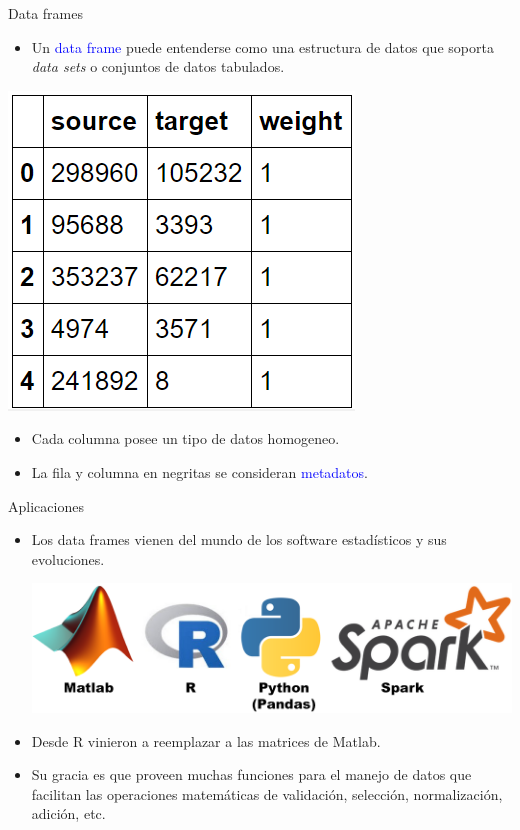 \documentclass[handout]{beamer} %
\newcommand{\blue}[1]{\textcolor{blue}{#1}}
\begin{document}
\begin{frame}{Data frames}
  \begin{itemize}
    \item Un \blue{data frame} puede entenderse como una estructura de datos que soporta {\em data sets} o conjuntos de datos tabulados.
  \end{itemize}
  \begin{center}
      \includegraphics[width=.4\textwidth]{./image/cap9/dataframe.png}
  \end{center}
  \begin{itemize}
      \item<2-> Cada columna posee un tipo de datos homogeneo.
      \item<3-> La fila y columna en negritas se consideran \blue{metadatos}.
  \end{itemize}
\end{frame}

\begin{frame}{Aplicaciones}
  \begin{itemize}
    \item<1-> Los data frames vienen del mundo de los software estadísticos y sus evoluciones.
    \begin{center}
      \includegraphics[width=.8\textwidth]{./image/cap9/tecnologias.png}
    \end{center}
    \item<2-> Desde R vinieron a reemplazar a las matrices de Matlab.
    \item<3-> Su gracia es que proveen muchas funciones para el manejo de datos que facilitan las operaciones matemáticas de validación, selección, normalización, adición, etc.
  \end{itemize}
\end{frame}
\end{document}
